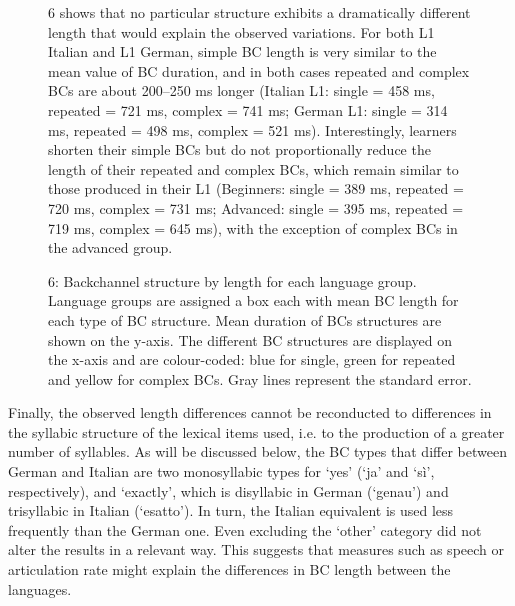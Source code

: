 \begin{figure}
\caption{6 shows that no particular structure exhibits a dramatically different length that would explain the observed variations. For both L1 Italian and L1 German, simple BC length is very similar to the mean value of BC duration, and in both cases repeated and complex BCs are about 200–250 ms longer (Italian L1: single = 458 ms, repeated = 721 ms, complex = 741 ms; German L1: single = 314 ms, repeated = 498 ms, complex = 521 ms). Interestingly, learners shorten their simple BCs but do not proportionally reduce the length of their repeated and complex BCs, which remain similar to those produced in their L1 (Beginners: single = 389 ms, repeated = 720 ms, complex = 731 ms; Advanced: single = 395 ms, repeated = 719 ms, complex = 645 ms), with the exception of complex BCs in the advanced group.}
\label{fig:key:4}
\end{figure}

  
 

\begin{stylecaption}\begin{figure}
\caption{6: Backchannel structure by length for each language group. Language groups are assigned a box each with mean BC length for each type of BC structure. Mean duration of BCs structures are shown on the y-axis. The different BC structures are displayed on the x-axis and are colour-coded: blue for single, green for repeated and yellow for complex BCs. Gray lines represent the standard error.}
\label{fig:key:4}
\end{figure}\end{stylecaption}

Finally, the observed length differences cannot be reconducted to differences in the syllabic structure of the lexical items used, i.e. to the production of a greater number of syllables. As will be discussed below, the BC types that differ between German and Italian are two monosyllabic types for ‘yes’ (‘ja’ and ‘sì’, respectively), and ‘exactly’,  which is disyllabic in German (‘genau’) and trisyllabic in Italian (‘esatto’). In turn, the Italian equivalent is used less frequently than the German one. Even excluding the ‘other’ category did not alter the results in a relevant way. This suggests that measures such as speech or articulation rate might explain the differences in BC length between the languages.

